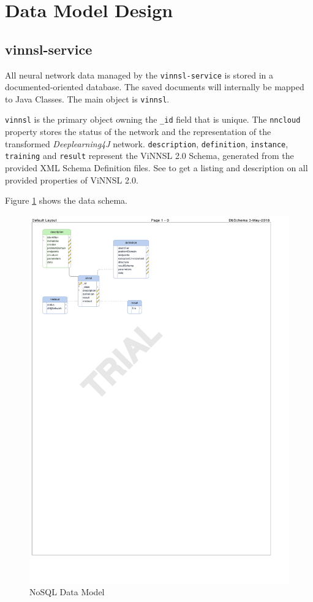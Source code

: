 \section{Data Model Design}\label{data-model-design}

\subsection{vinnsl-service}\label{vinnsl-service}

All neural network data managed by the \texttt{vinnsl-service} is stored
in a documented-oriented database. The saved documents will internally
be mapped to Java Classes. The main object is \texttt{vinnsl}.

\texttt{vinnsl} is the primary object owning the \texttt{\_id} field
that is unique. The \texttt{nncloud} property stores the status of the
network and the representation of the transformed \emph{Deeplearning4J}
network. \texttt{description}, \texttt{definition}, \texttt{instance},
\texttt{training} and \texttt{result} represent the ViNNSL 2.0 Schema,
generated from the provided XML Schema Definition files. See
\cite{kopica_2015} to get a listing and description on all provided
properties of ViNNSL 2.0.

Figure \ref{img.db_schema} shows the data schema.

\begin{figure}
\centering
\includegraphics[width=15.00000cm]{images/db_schema}
\caption{NoSQL Data Model \label{img.db_schema}}
\end{figure}

